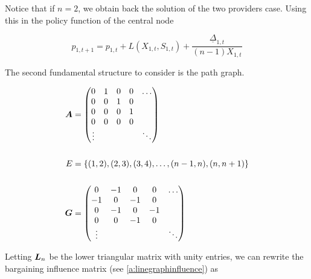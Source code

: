 Notice that if $n = 2$, we obtain back the solution of the two providers case. Using this in the policy function of the central node

\begin{equation} \label{policy_star}
  p_{1, t+1} = p_{1, t} + L(X_{1, t}, S_{1, t}) + \frac{\underline{\Delta}_{1, t}}{(n-1) X_{1, t}}
\end{equation}

The second fundamental structure to consider is the path graph.

\vspace{5mm}
\begin{minipage}{.5\textwidth}
  \resizebox{\textwidth}{!}{}
\end{minipage}
\begin{minipage}{.5\textwidth}
  \begin{equation*}
    \begin{split}
      \matr{A} &= \begin{pmatrix}
        0      & 1 & 0 & 0 & \ldots \\
        0      & 0 & 1 & 0 &        \\
        0      & 0 & 0 & 1 &        \\
        0      & 0 & 0 & 0 &        \\
        \vdots &   &   &   & \ddots
      \end{pmatrix} \\
      \vspace{5mm} \\
      E &= \set{(1, 2), (2, 3), (3, 4), \ldots, (n-1, n), (n, n+1)} \\
      \vspace{5mm} \\
      \G &= \begin{pmatrix}
        0      & -1 & 0  & 0  & \ldots \\
        -1     & 0  & -1 & 0  &        \\
        0      & -1 & 0  & -1 &        \\
        0      & 0  & -1 & 0  &        \\
        \vdots &    &    &    & \ddots
      \end{pmatrix}
    \end{split}
  \end{equation*}
\end{minipage}
\vspace{5mm}

Letting $\bm{L}_n$ be the lower triangular matrix with unity entries, we can rewrite the bargaining influence matrix (see \ref{a:linegraphinfluence}) as

